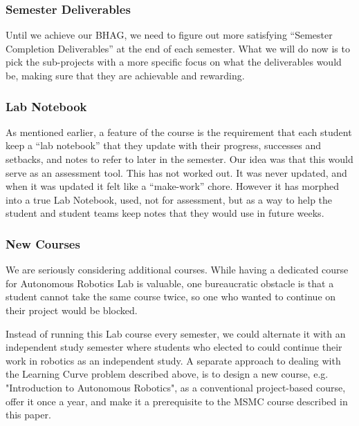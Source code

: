 \subsubsection{Semester Deliverables}Until we achieve our BHAG, we need to figure out more satisfying “Semester Completion Deliverables” at the end of each semester. What we will do now is to pick the sub-projects with a more specific focus on what the deliverables would be, making sure that they are achievable and rewarding.
\subsubsection{Lab Notebook}As mentioned earlier, a feature of the course is the requirement that each student keep a ``lab notebook'' that they update with their progress, successes and setbacks, and notes to refer to later in the semester. Our idea was that this would serve as an assessment tool. This has not worked out. It was never updated, and when it was updated it felt like a ``make-work'' chore. However it has morphed into a true Lab Notebook, used, not for assessment, but as a way to help the student and student teams keep notes that they would use in future weeks.
\subsubsection{New Courses}We are seriously considering additional courses. While having a dedicated course for Autonomous Robotics Lab is valuable, one bureaucratic obstacle is that a student cannot take the same course twice, so one who wanted to continue on their project would be blocked. 

Instead of running this Lab course every semester, we could alternate it with an independent study semester where students who elected to could continue their work in robotics as an independent study. A separate approach to dealing with the Learning Curve problem described above, is to design a new course, e.g. "Introduction to Autonomous Robotics", as a conventional project-based course, offer it once a year, and make it a prerequisite to the MSMC course described in this paper.

